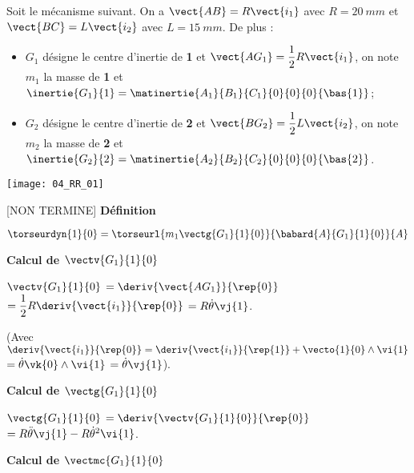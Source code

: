 \normaltrue
\correctionfalse


\setcounter{question}{0}
\ifcorrection
\else
{}
\fi

\ifprof
\else
Soit le mécanisme suivant. On a $\vect{AB}=R\vect{i_1}$ avec $R=\SI{20}{mm}$ et  
$\vect{BC}=L\vect{i_2}$ avec $L=\SI{15}{mm}$. De plus :
\begin{itemize}
\item $G_1$ désigne le centre d'inertie de \textbf{1} et $\vect{AG_1}=\dfrac{1}{2}R\vect{i_1}$, on note $m_1$ la masse de \textbf{1} et $\inertie{G_1}{1}=\matinertie{A_1}{B_1}{C_1}{0}{0}{0}{\bas{1}}$; 
\item $G_2$ désigne le centre d'inertie de \textbf{2} et $\vect{BG_2}=\dfrac{1}{2}L\vect{i_2}$, on note $m_2$ la masse de \textbf{2} et $\inertie{G_2}{2}=\matinertie{A_2}{B_2}{C_2}{0}{0}{0}{\bas{2}}$.
\end{itemize}
\begin{center}
\texttt{[image: 04\_RR\_01]}
\end{center}
\fi

\ifprof

[NON TERMINE]
\textbf{Définition}

$\torseurdyn{1}{0} = \torseurl{m_1 \vectg{G_1}{1}{0}}{\babard{A}{G_1}{1}{0}}{A}$

\textbf{Calcul de $\vectv{G_1}{1}{0}$}

$\vectv{G_1}{1}{0}$ $ = \deriv{\vect{AG_1}}{\rep{0}}$
$ = \dfrac{1}{2}R\deriv{\vect{i_1}}{\rep{0}}$
$ = R\dot{\theta}\vj{1}$.

(Avec $\deriv{\vect{i_1}}{\rep{0}} = \deriv{\vect{i_1}}{\rep{1}} + \vecto{1}{0}\wedge \vi{1}$
$ = \dot{\theta}\vk{0}\wedge \vi{1}$ $ = \dot{\theta}\vj{1}$).

\textbf{Calcul de $\vectg{G_1}{1}{0}$}

$\vectg{G_1}{1}{0}$ $ = \deriv{{\vectv{G_1}{1}{0}}}{\rep{0}}$
$ =  R\ddot{\theta}\vj{1} - R\dot{\theta}^2\vi{1} $.

\textbf{Calcul de $\vectmc{G_1}{1}{0}$}

